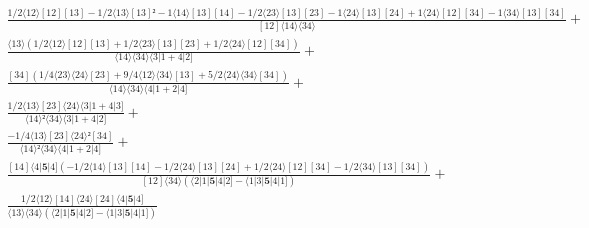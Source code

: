 \documentclass[varwidth, border=5pt]{standalone}
\begin{document}
\begin{my}
$\begin{gathered}
\scriptscriptstyle\frac{1/2⟨12⟩[12][13]-1/2⟨13⟩[13]²-1⟨14⟩[13][14]-1/2⟨23⟩[13][23]-1⟨24⟩[13][24]+1⟨24⟩[12][34]-1⟨34⟩[13][34]}{[12]⟨14⟩⟨34⟩} +\\
\scriptscriptstyle\frac{⟨13⟩(1/2⟨12⟩[12][13]+1/2⟨23⟩[13][23]+1/2⟨24⟩[12][34])}{⟨14⟩⟨34⟩⟨3|1+4|2]} +\\
\scriptscriptstyle\frac{[34](1/4⟨23⟩⟨24⟩[23]+9/4⟨12⟩⟨34⟩[13]+5/2⟨24⟩⟨34⟩[34])}{⟨14⟩⟨34⟩⟨4|1+2|4]} +\\
\scriptscriptstyle\frac{1/2⟨13⟩[23]⟨24⟩⟨3|1+4|3]}{⟨14⟩²⟨34⟩⟨3|1+4|2]} +\\
\scriptscriptstyle\frac{-1/4⟨13⟩[23]⟨24⟩²[34]}{⟨14⟩²⟨34⟩⟨4|1+2|4]} +\\
\scriptscriptstyle\frac{[14]⟨4|𝟓|4](-1/2⟨14⟩[13][14]-1/2⟨24⟩[13][24]+1/2⟨24⟩[12][34]-1/2⟨34⟩[13][34])}{[12]⟨34⟩(⟨2|1|𝟓|4|2]-⟨1|3|𝟓|4|1])} +\\
\scriptscriptstyle\frac{1/2⟨12⟩[14]⟨24⟩[24]⟨4|𝟓|4]}{⟨13⟩⟨34⟩(⟨2|1|𝟓|4|2]-⟨1|3|𝟓|4|1])} \phantom{+}
\end{gathered}$
\end{my}
\end{document}
